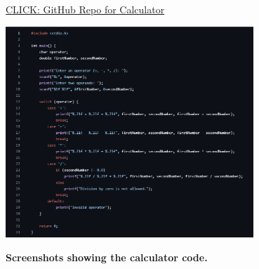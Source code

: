 \documentclass[a4paper,12pt]{article}
\begin{document}
\href{https://github.com/Nehaaa05/calculator/blob/main/calculator.c}{CLICK: GitHub Repo for Calculator}
\par\vspace{2em}
\includegraphics[width=0.7\textwidth]{ccalcula.png}
\par\vspace{2em}
\large\textbf{Screenshots showing the calculator code.}
\par\vspace{2em}
\vspace{0.3in}


\newpage
\end{document}
